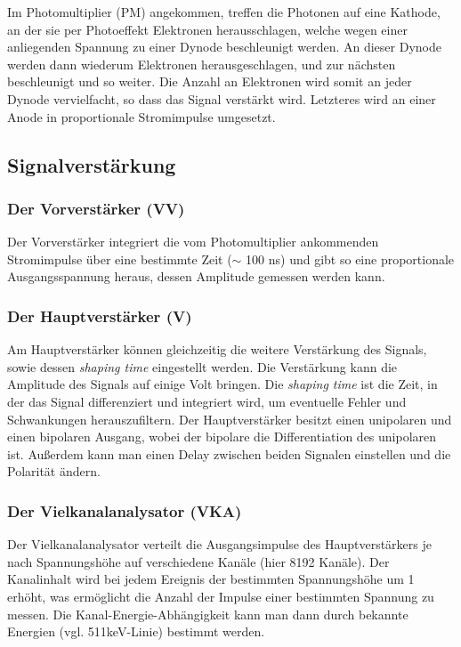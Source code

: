 Im Photomultiplier (PM) angekommen, treffen die Photonen auf eine Kathode, an der sie per Photoeffekt Elektronen herausschlagen, welche wegen einer anliegenden Spannung zu einer Dynode beschleunigt werden. An dieser Dynode werden dann wiederum Elektronen herausgeschlagen, und zur nächsten beschleunigt und so weiter. Die Anzahl an Elektronen wird somit an jeder Dynode vervielfacht, so dass das Signal verstärkt wird. Letzteres wird an einer Anode in proportionale Stromimpulse umgesetzt.

\subsection{Signalverstärkung}

\subsubsection{Der Vorverstärker (VV)}

Der Vorverstärker integriert die vom Photomultiplier ankommenden Stromimpulse über eine bestimmte Zeit ($\sim$ 100 ns) und gibt so eine proportionale Ausgangsspannung heraus, dessen Amplitude gemessen werden kann.

\subsubsection{Der Hauptverstärker (V)}

Am Hauptverstärker können gleichzeitig die weitere Verstärkung des Signals, sowie dessen \emph{shaping time} eingestellt werden. Die Verstärkung kann die Amplitude des Signals auf einige Volt bringen.  Die \emph{shaping time} ist die Zeit, in der das Signal differenziert und integriert wird, um eventuelle Fehler und Schwankungen herauszufiltern. Der Hauptverstärker besitzt einen unipolaren und einen bipolaren Ausgang, wobei der bipolare die Differentiation des unipolaren ist. Außerdem kann man einen Delay zwischen beiden Signalen einstellen und die Polarität ändern.

\subsubsection{Der Vielkanalanalysator (VKA)}

Der Vielkanalanalysator verteilt die Ausgangsimpulse des Hauptverstärkers je nach Spannungshöhe auf verschiedene Kanäle (hier 8192 Kanäle). Der Kanalinhalt wird bei jedem Ereignis der bestimmten Spannungshöhe um 1 erhöht, was ermöglicht die Anzahl der Impulse einer bestimmten Spannung zu messen. Die Kanal-Energie-Abhängigkeit kann man dann durch bekannte Energien (vgl. 511keV-Linie) bestimmt werden.

